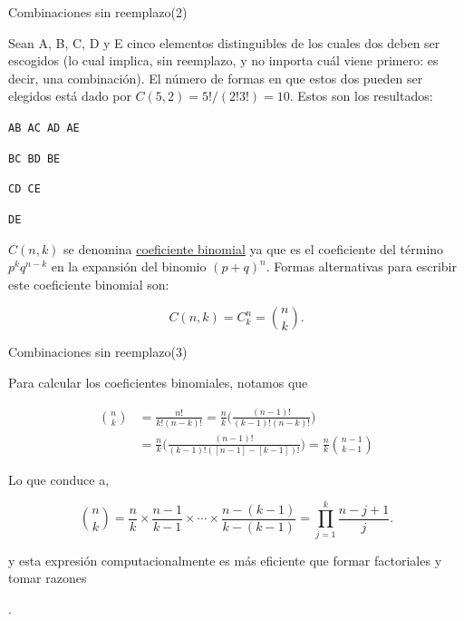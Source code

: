 \documentclass[10pt]{beamer}
\begin{document}
\begin{frame}{Combinaciones sin reemplazo(2)}

\small{Sean A, B, C, D y E cinco elementos distinguibles de los cuales dos deben ser escogidos (lo cual implica, sin reemplazo, y no importa cu\'al viene primero: es decir, una combinaci\'on). El n\'umero de formas en que estos dos pueden ser elegidos est\'a dado por $C(5,2) = 5!/(2!3!) = 10$. Estos son los resultados:


\qquad \qquad \texttt{AB    AC   AD   AE}

\qquad \qquad \texttt{BC   BD   BE}

\qquad \qquad  \texttt{CD   CE}

\qquad \qquad  \texttt{DE}
}

\vspace{0.2cm}


$C(n, k)$ se denomina \underline{coeficiente binomial} ya que  es el coeficiente del t\'ermino $p^k q^{n-k}$ en la expansi\'on del binomio $(p + q)^n$. Formas alternativas para escribir este coeficiente binomial son:

\[
C(n , k) = C_{k}^{n} = \binom{n}{k}.
\]

\end{frame}
\begin{frame}{Combinaciones sin reemplazo(3)}

\small{Para calcular los coeficientes binomiales, notamos que

\begin{align*}
\binom{n}{k} & = \frac{n!}{k!(n - k)!} = \frac{n}{k}\Biggl(\frac{(n -1)!}{(k -1)!(n -k)!} \Biggr)\\
& = \frac{n}{k}\Biggl(\frac{(n -1)!}{(k -1)!([n -1] -[k -1])!}\Biggr) = \frac{n}{k}\binom{n - 1}{k -1}
\end{align*}


Lo que conduce a, 



\[
\binom{n}{k} = \frac{n}{k}\times\frac{n -1}{k -1}\times \cdots \times \frac{n - (k -1)}{k - (k -1)} = \displaystyle \prod_{j =1}^{k}\frac{n - j + 1}{j}.
\]



y esta expresi\'on  computacionalmente es m\'as eficiente   que formar factoriales y tomar razones}.

\end{frame}
\end{document}
